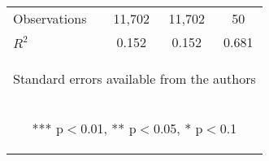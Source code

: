 \begin{center}
\begin{tabular}{lccc}
\midrule Observations & 11,702 & 11,702 & 50 \\
 $R^2$ & 0.152 & 0.152 & 0.681 \\ \bottomrule
\multicolumn{4}{c}{\begin{footnotesize} Standard errors available from the authors\end{footnotesize}} \\
\multicolumn{4}{c}{\begin{footnotesize} *** p$<$0.01, ** p$<$0.05, * p$<$0.1\end{footnotesize}} \\
\end{tabular}
\end{center}
